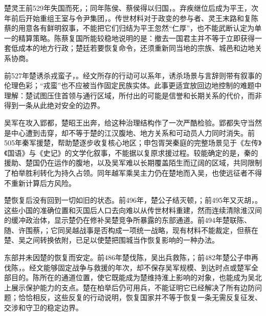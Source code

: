 \begin{debate}[灭国与复国之间的统治成本]
楚灵王前529年失国而死，；同年陈侯、蔡侯得以归国，。弃疾继位后成为平王，次年前后开始重组王室与令尹集团，。传世材料对于政变的参与者、灵王末路和复陈蔡的用意各有鲜明叙事，不能把它们归结为平王忽然“仁厚”，也不能武断认定为单一的精算策略。陈蔡复国所能较稳地说明的是：撤去一国君主并不等于立即获得一套低成本的地方行政；楚廷若要恢复命令，还须重新同当地的宗族、城邑和边地关系协商。
\end{debate}

前527年楚诱杀戎蛮子，。经文所存的行动可以系年，诱杀场景与言辞则带有叙事的伦理色彩；“戎蛮”也不应被当作固定民族实体。此事更适宜放回边地控制的难题中理解：楚试图压住首领与通行区域，所付出的可能是信誉和长期关系的代价，而非得到一条从此绝对安全的边界。

吴军在攻入郢都，楚昭王出奔，给这种治理结构作了一次严酷检验。郢都失守当然是中心遭到击穿，却不等于楚的江汉腹地、地方关系和可动员人力同时消失。前505年秦军援楚，帮助楚逐步收复核心地区；申包胥哭秦庭的完整场景见于《左传》《国语》与《史记》的文学化叙事，不能据以复原求援过程。较能确定的是，秦的援助、楚国仍在运作的腹地，以及吴军难以长期覆盖陌生而辽阔的区域，共同限制了柏举胜利转化为持久占领。同年越军乘吴主力仍在楚地而入吴，也使远征者不得不重新计算后方风险。

楚恢复后没有回到一切如旧的状态。前496年，楚公子结灭顿，；前495年又灭胡，。这些小国的准确位置和灭国后人口去向难以从传世材料重建，然而连续清除淮汉间的缓冲政治体，显示楚仍在修补吴楚竞争所暴露的东部通道。前494年楚联陈、随、许围蔡，；它同吴越战事是否构成一项统一战略，现有材料不能裁定，但蔡在楚、吴之间转换依附，已足以使楚把围城当作恢复影响的一种办法。

东部并未因楚的恢复而安定。前486年楚伐陈，吴出兵救陈，；前482年楚公子申再伐陈，。经文能够固定战争与救援的年次，却不保存吴军规模、到达时点或楚军全部目的。陈所在的通道位置，使它既能成为楚维持淮上影响的对象，也能成为吴北上展示保护能力的支点。楚在柏举后仍可用兵，不能证明它已经解决了所有边防问题；恰恰相反，这些反复的行动说明，恢复国家并不等于恢复一条无需反复征发、交涉和守卫的稳定边界。

